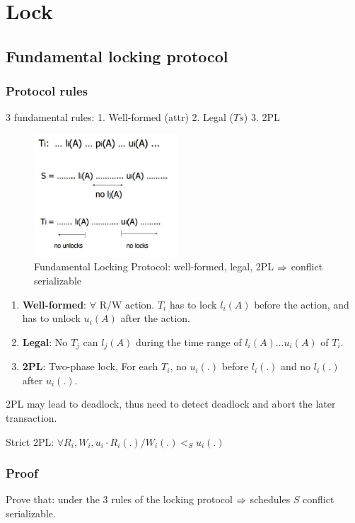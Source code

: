 \documentclass[a4paper]{report}
\begin{document}
\section{Lock}
\subsection{Fundamental locking protocol}
\subsubsection{Protocol rules}
3 fundamental rules: 1. Well-formed (attr) 2. Legal ($Ts$) 3. 2PL
\begin{figure}[H]
    \centerline{\includegraphics[height = 1.8in]{img/lockFundamental}}
    \caption{Fundamental Locking Protocol: well-formed, legal, 2PL $\Rightarrow$ conflict serializable}
  \label{fig:fundamentalLockingProtocol}
\end{figure}
\begin{enumerate}
\item \textbf{Well-formed}: $\forall$ R/W action. $T_i$ has to lock $l_i(A)$ before the action, and has to unlock $u_i(A)$ after the action.
\item \textbf{Legal}: No $T_j$ can $l_j(A)$ during the time range of $l_i(A) ... u_i(A)$ of $T_i$.
\item \textbf{2PL}: Two-phase lock, For each $T_i$, no $u_i(.)$ before $l_i(.)$ and no $l_i(.)$ after $u_i(.)$.
\end{enumerate}

2PL may lead to deadlock, thus need to detect deadlock and abort the later transaction.

Strict 2PL: $\forall R_i, W_i, u_i \cdot R_i(.)/W_i(.) <_S u_i(.) $

\subsubsection{Proof}
Prove that: under the 3 rules of the locking protocol $\Rightarrow$ schedules $S$ conflict serializable.
\end{document}
